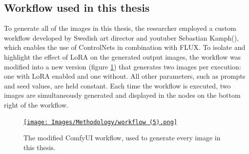 \subsection{Workflow used in this thesis}
To generate all of the images in this thesis, the researcher employed a custom workflow developed by Swedish art director and youtuber Sebastian Kamph(\cite{sebastian_kamph_flux_2024}), which enables the use of ControlNets in combination with FLUX. To isolate and highlight the effect of LoRA on the generated output images, the workflow was modified into a new version (figure \ref{fig:own comfy workflow}) that generates two images per execution: one with LoRA enabled and one without. All other parameters, such as prompts and seed values, are held constant. Each time the workflow is executed, two images are simultaneously generated and displayed in the nodes on the bottom right of the workflow.\\ 
\begin{figure}[H]
    \centering
    \href{https://github.com/matijspeeters/Thesis/blob/main/Images/Methodology/workflow%20(5).png}{\texttt{[image: Images/Methodology/workflow (5).png]}}
    \caption{The modified ComfyUI workflow, used to generate every image in this thesis.}
    \label{fig:own comfy workflow}
\end{figure}